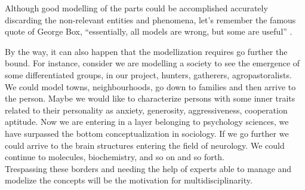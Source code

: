\documentclass[11pt,oneside,a4paper,openright]{report}
\begin{document}
% 
%

Although good modelling of the parts could be accomplished accurately discarding the non-relevant entities and phenomena, let's remember the famous quote of George Box, ``essentially, all models are wrong, but some are useful'' \cite[p.2]{Box1979}.


By the way, it can also happen that the modellization requires go further the bound. For instance, consider we are modelling a society to see the emergence of some differentiated groups, in our project, hunters, gatherers, agropastoralists. 
We could model towns, neighbourhoods, go down to families and then arrive to the person. Maybe we would like to characterize persons with some inner traits related to their personality as anxiety, generosity, aggressiveness, cooperation aptitude. Now we are entering in a layer belonging to psychology sciences, we have surpassed the bottom conceptualization in sociology. If we go further we could arrive to the brain structures entering the field of neurology. We could continue to molecules, biochemistry, and so on and so forth\cite[p.56]{MWilliams1999}.\\
Trespassing these borders and needing the help of experts able to manage and modelize the concepts will be the motivation for multidisciplinarity. 

\end{document}
